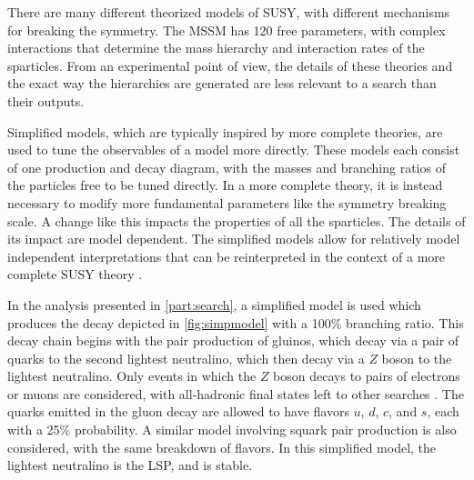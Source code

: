 There are many different theorized models of \ac{SUSY}, with different mechanisms for breaking the symmetry. The \ac{MSSM} has 120 free parameters, with complex interactions that determine the mass hierarchy and interaction rates of the sparticles. From an experimental point of view, the details of these theories and the exact way the hierarchies are generated are less relevant to a search than their outputs. 

Simplified models, which are typically inspired by more complete theories, are used to tune the observables of a model more directly. These models each consist of one production and decay diagram, with the masses and branching ratios of the particles free to be tuned directly. In a more complete theory, it is instead necessary to modify more fundamental parameters like the symmetry breaking scale. A change like this impacts the properties of all the sparticles. The details of its impact are model dependent. The simplified models allow for relatively model independent interpretations that can be reinterpreted in the context of a more complete \ac{SUSY} theory \cite{1608.00872}.

In the analysis presented in \autoref{part:search}, a simplified model is used which produces the decay depicted in \autoref{fig:simpmodel} with a 100\% branching ratio. This decay chain begins with the pair production of gluinos, which decay via a pair of quarks to the second lightest neutralino, which then decay via a $Z$ boson to the lightest neutralino. Only events in which the $Z$ boson decays to pairs of electrons or muons are considered, with all-hadronic final states left to other searches \cite{ATLAS:2016kts}. The quarks emitted in the gluon decay are allowed to have flavors $u$, $d$, $c$, and $s$, each with a 25\% probability. A similar model involving squark pair production is also considered, with the same breakdown of flavors. In this simplified model, the lightest neutralino is the \ac{LSP}, and is stable. 

